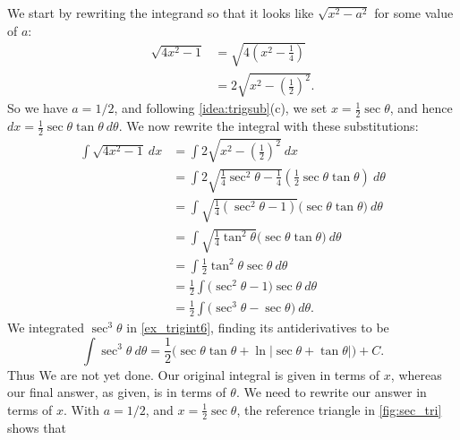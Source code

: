 {We start by rewriting the integrand so that it looks like $\sqrt{x^2-a^2}$ for some value of $a$:
\begin{align*}
\sqrt{4x^2-1} &= \sqrt{4\left(x^2-\frac14\right)}\\
		&= 2\sqrt{x^2-\left(\frac12\right)^2}.
\end{align*}
So we have $a=1/2$, and following \autoref{idea:trigsub}(c), we set $x= \frac12\sec\theta$, and hence $dx = \frac12\sec\theta\tan\theta\ d\theta$. %
We now rewrite the integral with these substitutions:
\begin{align*}
\int \sqrt{4x^2-1}\ dx &= \int 2\sqrt{x^2-\left(\frac12\right)^2}\ dx\\
			&= \int 2\sqrt{\frac14\sec^2\theta - \frac14}\left(\frac12\sec\theta\tan\theta\right)\ d\theta\\
			&=\int \sqrt{\frac14(\sec^2\theta-1)}\Big(\sec\theta\tan\theta\Big)\ d\theta\\
			&=\int\sqrt{\frac14\tan^2\theta}\Big(\sec\theta\tan\theta\Big)\ d\theta\\
			&=\int \frac12\tan^2\theta\sec\theta\ d\theta\\
			&=\frac12\int \Big(\sec^2\theta-1\Big)\sec\theta\ d\theta\\
			&=\frac12\int \big(\sec^3\theta - \sec\theta\big)\ d\theta.
\end{align*}
We integrated $\sec^3\theta$ in \autoref{ex_trigint6}, finding its antiderivatives to be
$$\int \sec^3\theta\ d\theta = \frac12\Big(\sec \theta\tan \theta + \ln|\sec \theta+\tan \theta|\Big)+C.$$
Thus
We are not yet done. Our original integral is given in terms of $x$, whereas our final answer, as given, is in terms of $\theta$. We need to rewrite our answer in terms of $x$. With $a=1/2$, and $x=\frac12\sec\theta$, the reference triangle in \autoref{fig:sec_tri} shows that
}

